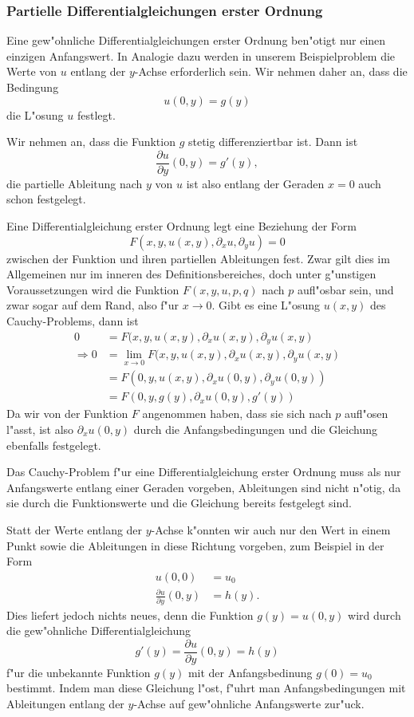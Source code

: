 \subsubsection{Partielle Differentialgleichungen erster Ordnung}
Eine gew"ohnliche Differentialgleichungen erster Ordnung ben"otigt
nur einen einzigen Anfangswert.
In Analogie dazu werden in unserem Beispielproblem 
die Werte von $u$ entlang der $y$-Achse erforderlich sein.
Wir nehmen daher an, dass die Bedingung
\[
u(0,y)=g(y)
\]
die L"osung $u$ festlegt.

Wir nehmen an, dass die Funktion $g$ stetig differenziertbar ist.
Dann ist
\[
\frac{\partial u}{\partial y}(0, y)=g'(y),
\]
die partielle Ableitung nach $y$ von $u$ ist also entlang der
Geraden $x=0$ auch schon festgelegt. 

Eine Differentialgleichung erster Ordnung legt eine Beziehung
der Form
\[
F(x,y,u(x,y), \partial_x u, \partial_y u)=0
\]
zwischen der Funktion und ihren partiellen Ableitungen fest.
Zwar gilt dies im Allgemeinen nur im inneren des Definitionsbereiches,
doch
unter g"unstigen Voraussetzungen wird die Funktion $F(x,y,u,p,q)$
nach $p$ aufl"osbar sein, und zwar sogar auf dem Rand, also f"ur
$x\to 0$. Gibt es eine L"osung $u(x,y)$ des Cauchy-Problems, dann
ist 
\begin{align*}
0&=
F(x,y,u(x,y), \partial_x u(x,y), \partial_y u(x,y)
\\
\Rightarrow
0&=
\lim_{x\to 0}
F(x,y,u(x,y), \partial_x u(x,y), \partial_y u(x,y)\\
&=F(0,y,u(x,y),\partial_x u(0,y), \partial_y u(0,y))
\\
&=
F(0,y,g(y),\partial_x u(0,y), g'(y))
\end{align*}
Da wir von der Funktion $F$ angenommen haben, dass sie sich
nach $p$ aufl"osen l"asst, ist also $\partial_x u(0,y)$ durch
die Anfangsbedingungen und die Gleichung ebenfalls festgelegt.

Das Cauchy-Problem f"ur eine Differentialgleichung erster Ordnung
muss als nur Anfangswerte entlang einer Geraden vorgeben, Ableitungen
sind nicht n"otig, da sie durch die Funktionswerte und die Gleichung
bereits festgelegt sind.

Statt der Werte entlang der $y$-Achse k"onnten wir auch nur den
Wert in einem Punkt sowie die Ableitungen
in diese Richtung vorgeben, zum Beispiel in der Form
\begin{align*}
u(0,0)&=u_0\\
\frac{\partial u}{\partial y}(0,y)&=h(y).
\end{align*}
Dies liefert jedoch nichts neues, denn die Funktion $g(y)=u(0,y)$
wird durch die gew"ohnliche Differentialgleichung
\[
g'(y)=\frac{\partial u}{\partial y}(0,y)=h(y)
\]
f"ur die unbekannte Funktion $g(y)$
mit der Anfangsbedinung $g(0)=u_0$ bestimmt.
Indem man diese Gleichung l"ost, f"uhrt man Anfangsbedingungen
mit Ableitungen entlang der $y$-Achse auf gew"ohnliche
Anfangswerte zur"uck.

